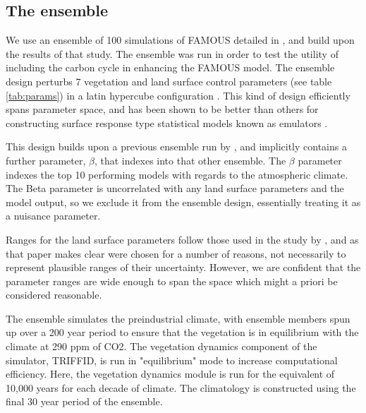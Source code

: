 \documentclass[esd, manuscript]{copernicus}
\begin{document}
\subsection{The ensemble}
We use an ensemble of 100 simulations of FAMOUS detailed in \citep{williams2013optimising}, and build upon the results of that study. The ensemble was run in order to test the utility of including the carbon cycle in enhancing the FAMOUS model. The ensemble design perturbs 7 vegetation and land surface control parameters (see table \ref{tab:params}) in a latin hypercube configuration \citep{mckay1979comparison}. This kind of design efficiently spans parameter space, and has been shown to be better than others for constructing surface response type statistical models known as emulators \citep{urban2010comparison}.

This design builds upon a previous ensemble run by \citep{gregoire2010optimal}, and implicitly contains a further parameter, $\beta$, that indexes into that other ensemble. The $\beta$ parameter  indexes the top 10 performing models with regards to the atmospheric climate. The Beta parameter is uncorrelated with any land surface parameters and the model output, so we exclude it from the ensemble design, essentially treating it as a nuisance parameter.

Ranges for the land surface parameters follow those used in the study by \citep{booth2012highsensitivity}, and as that paper makes clear were chosen for a number of reasons, not necessarily to represent plausible ranges of their uncertainty. However, we are confident that the parameter ranges are wide enough to span the space which might a priori be considered reasonable.

The ensemble simulates the preindustrial climate, with ensemble members spun up over a 200 year period to ensure that the vegetation is in equilibrium with the climate at 290 ppm of CO2. The vegetation dynamics component of the simulator, TRIFFID, is run in "equilibrium" mode to increase computational efficiency. Here, the vegetation dynamics module is run for the equivalent of 10,000 years for each decade of climate. The climatology is constructed using the final 30 year period of the ensemble. 


%
%
%
%	
\end{document}
